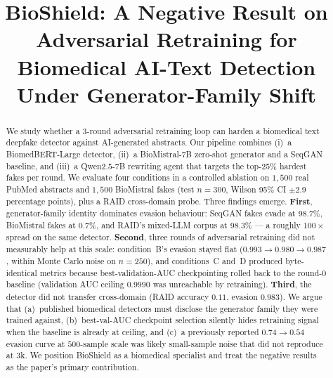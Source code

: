 \documentclass[conference]{IEEEtran}
\begin{document}
\title{BioShield: A Negative Result on Adversarial Retraining for Biomedical AI-Text Detection Under Generator-Family Shift}

\author{
}

\maketitle

\begin{abstract}
We study whether a 3-round adversarial retraining loop can harden a biomedical
text deepfake detector against AI-generated abstracts. Our pipeline combines
(i)~a BiomedBERT-Large detector, (ii)~a BioMistral-7B zero-shot generator and a
SeqGAN baseline, and (iii)~a Qwen2.5-7B rewriting agent that targets the
top-25\% hardest fakes per round. We evaluate four conditions in a controlled
ablation on \(1{,}500\) real PubMed abstracts and \(1{,}500\) BioMistral fakes
(test \(n=300\), Wilson 95\% CI \(\pm 2.9\) percentage points), plus a RAID
cross-domain probe. Three findings emerge. \textbf{First}, generator-family
identity dominates evasion behaviour: SeqGAN fakes evade at \(98.7\%\),
BioMistral fakes at \(0.7\%\), and RAID's mixed-LLM corpus at \(98.3\%\) — a
roughly \(100\times\) spread on the same detector. \textbf{Second}, three
rounds of adversarial retraining did not measurably help at this scale:
condition~B's evasion stayed flat (\(0.993 \to 0.980 \to 0.987\), within Monte
Carlo noise on \(n=250\)), and conditions~C and~D produced byte-identical
metrics because best-validation-AUC checkpointing rolled back to the round-0
baseline (validation AUC ceiling \(0.9990\) was unreachable by retraining).
\textbf{Third}, the detector did not transfer cross-domain (RAID accuracy
\(0.11\), evasion \(0.983\)). We argue that (a)~published biomedical detectors
must disclose the generator family they were trained against, (b)~best-val-AUC
checkpoint selection silently hides retraining signal when the baseline is
already at ceiling, and (c)~a previously reported \(0.74 \to 0.54\) evasion
curve at \(500\)-sample scale was likely small-sample noise that did not
reproduce at \(3\)k. We position BioShield as a biomedical specialist and
treat the negative results as the paper's primary contribution.
\end{abstract}
\end{document}
